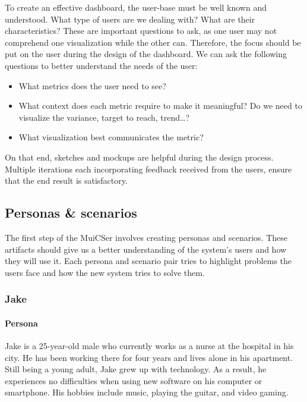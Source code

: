         \noindent To create an effective dashboard, the user-base must be well known and understood. What type of users are we dealing with? What are their characteristics? These are important questions to ask, as one user may not comprehend one visualization while the other can. Therefore, the focus should be put on the user during the design of the dashboard\cite{Brath2004}. We can ask the following questions to better understand the needs of the user:
        
        \begin{itemize}
            \item What metrics does the user need to see?
            \item What context does each metric require to make it meaningful? Do we need to visualize the variance, target to reach, trend\ldots?
            \item What visualization best communicates the metric?
        \end{itemize}

        \noindent On that end, sketches and mockups are helpful during the design process. Multiple iterations each incorporating feedback received from the users, ensure that the end result is satisfactory.

    \subsection{Personas \& scenarios}\label{3_personas_scenarios}

    The first step of the MuiCSer involves creating personas and scenarios. These artifacts should give us a better understanding of the system's users and how they will use it. Each persona and scenario pair tries to highlight problems the users face and how the new system tries to solve them.

        \subsubsection{Jake}

        \paragraph{Persona} Jake is a 25-year-old male who currently works as a nurse at the hospital in his city. He has been working there for four years and lives alone in his apartment. Still being a young adult, Jake grew up with technology. As a result, he experiences no difficulties when using new software on his computer or smartphone. His hobbies include music, playing the guitar, and video gaming.

